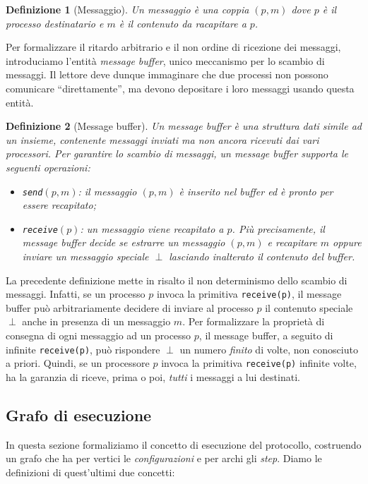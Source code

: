 \documentclass{article}
\newtheorem{definizione}{Definizione}
\begin{document}
\begin{definizione}[Messaggio]
  Un messaggio è una coppia $(p,m)$ dove $p$ è il processo
  destinatario e $m$ è il contenuto da racapitare a $p$.
\end{definizione}

Per formalizzare il ritardo arbitrario e il non ordine di ricezione
dei messaggi, introduciamo l'entit\`a \emph{message buffer}, unico
meccanismo per lo scambio di messaggi. Il lettore deve dunque
immaginare che due processi non possono comunicare ``direttamente'',
ma devono depositare i loro messaggi usando questa entit\`a.

\begin{definizione}[Message buffer]
  Un \emph{message buffer} \`e una struttura dati simile ad un
  insieme, contenente messaggi inviati ma non ancora ricevuti dai vari
  processori. Per garantire lo scambio di messaggi, un message buffer
  supporta le seguenti operazioni:
\begin{itemize}
\item \texttt{send$(p,m)$}: il messaggio $(p,m)$ è inserito nel buffer
  ed è pronto per essere recapitato;
\item \texttt{receive$(p)$}: un messaggio viene recapitato a $p$. Più
  precisamente, il message buffer decide se estrarre un messaggio
  $(p,m)$ e recapitare $m$ oppure inviare un messaggio speciale
  $\perp$ lasciando inalterato il contenuto del buffer.
\end{itemize}
\end{definizione}
La precedente definizione mette in risalto il non determinismo dello
scambio di messaggi. Infatti, se un processo $p$ invoca la primitiva
\texttt{receive(p)}, il message buffer può arbitrariamente decidere di
inviare al processo $p$ il contenuto speciale $\perp$ anche in
presenza di un messaggio $m$. Per formalizzare la propriet\`a di
consegna di ogni messaggio ad un processo $p$, il message buffer, a
seguito di infinite \texttt{receive(p)}, può rispondere $\perp$ un
numero \emph{finito} di volte, non conosciuto a priori. Quindi, se un
processore $p$ invoca la primitiva \texttt{receive(p)} infinite volte,
ha la garanzia di riceve, prima o poi, \emph{tutti} i messaggi a lui
destinati.

\subsection{Grafo di esecuzione}

In questa sezione formaliziamo il concetto di esecuzione del
protocollo, costruendo un grafo che ha per vertici le
\emph{configurazioni} e per archi gli \emph{step}. Diamo le
definizioni di quest'ultimi due concetti:
\end{document}

